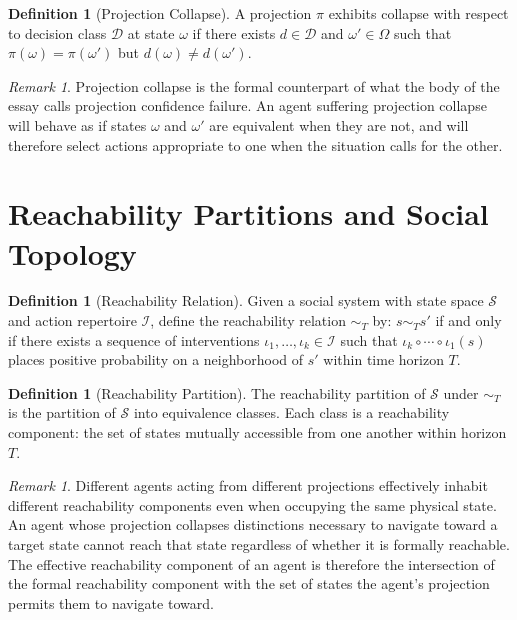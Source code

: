 \documentclass[12pt, a4paper]{article}
\theoremstyle{plain}
\theoremstyle{definition}
\newtheorem{definition}[theorem]{Definition}
\theoremstyle{remark}
\newtheorem{remark}[theorem]{Remark}
\begin{document}
\begin{definition}[Projection Collapse]
A projection $\pi$ exhibits collapse with respect
to decision class $\mathcal{D}$ at state
$\omega$ if there exists $d \in \mathcal{D}$
and $\omega' \in \Omega$ such that
$\pi(\omega) = \pi(\omega')$ but
$d(\omega) \neq d(\omega')$.
\end{definition}

\begin{remark}
Projection collapse is the formal counterpart of
what the body of the essay calls projection
confidence failure. An agent suffering projection
collapse will behave as if states $\omega$ and
$\omega'$ are equivalent when they are not, and
will therefore select actions appropriate to one
when the situation calls for the other.
\end{remark}

\section{Reachability Partitions and Social Topology}

\begin{definition}[Reachability Relation]
Given a social system with state space $\mathcal{S}$
and action repertoire $\mathcal{I}$, define the
reachability relation $\sim_T$ by: $s \sim_T s'$
if and only if there exists a sequence of
interventions $\iota_1, \ldots, \iota_k \in
\mathcal{I}$ such that $\iota_k \circ \cdots
\circ \iota_1(s)$ places positive probability
on a neighborhood of $s'$ within time horizon $T$.
\end{definition}

\begin{definition}[Reachability Partition]
The reachability partition of $\mathcal{S}$ under
$\sim_T$ is the partition of $\mathcal{S}$ into
equivalence classes. Each class is a reachability
component: the set of states mutually accessible
from one another within horizon $T$.
\end{definition}

\begin{remark}
Different agents acting from different projections
effectively inhabit different reachability
components even when occupying the same physical
state. An agent whose projection collapses
distinctions necessary to navigate toward a target
state cannot reach that state regardless of
whether it is formally reachable. The effective
reachability component of an agent is therefore
the intersection of the formal reachability
component with the set of states the agent's
projection permits them to navigate toward.
\end{remark}
\end{document}

